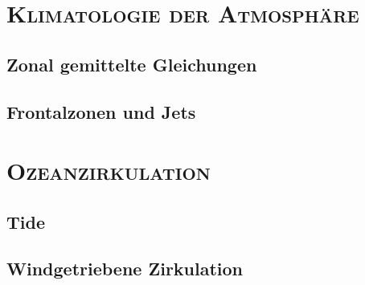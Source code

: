 \documentclass{book}
\begin{document}
\chapter{\normalfont\textsc{Klimatologie der Atmosphäre}}
\label{chap:klimatologie_der_atmosphaere}

\section{Zonal gemittelte Gleichungen}
\label{sec:zonal_gemittelte_gleichungen}

\section{Frontalzonen und Jets}
\label{sec:frontalzonen_und_jets}

\chapter{\normalfont\textsc{Ozeanzirkulation}}
\label{chap:ozeanzirkulation}

\section{Tide}
\label{sec:tide}

\section{Windgetriebene Zirkulation}
\label{sec:windgetriebene_zirkulation}
\end{document}
